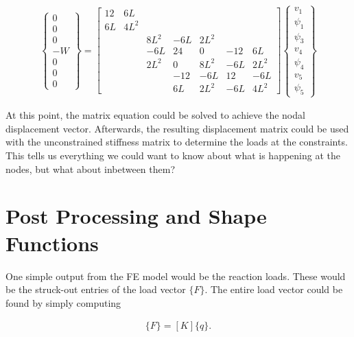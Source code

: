 \documentclass[10pt,letterpaper]{article}
\begin{document}
	\begin{align}
		\begin{Bmatrix}
			0 \\
			0 \\
			0 \\
			-W \\
			0 \\
			0 \\
			0
		\end{Bmatrix} = \begin{bmatrix}
12 & 6L & & & & & \\
6L & 4L^2 & & & & & \\
 & & 8L^2 & -6L & 2L^2 & & \\
 & & -6L & 24 & 0 & -12 & 6L \\
 & & 2L^2 & 0 & 8L^2 & -6L & 2L^2 \\
 & & & -12 & -6L & 12 & -6L \\
 & & & 6L & 2L^2 & -6L & 4L^2 
 		\end{bmatrix} \begin{Bmatrix}
			v_1 \\
			\psi_1 \\
			\psi_3 \\
			v_4 \\
			\psi_4 \\
			v_5 \\
			\psi_5
		\end{Bmatrix}
	\end{align}

	At this point, the matrix equation could be solved to achieve the nodal displacement vector. Afterwards, the resulting displacement matrix could be used with the unconstrained stiffness matrix to determine the loads at the constraints. This tells us everything we could want to know about what is happening at the nodes, but what about inbetween them?

	\newpage
	\section{Post Processing and Shape Functions}

	One simple output from the FE model would be the reaction loads. These would be the struck-out entries of the load vector $\{F\}$. The entire load vector could be found by simply computing 

	\begin{align}
		\{F\} = [K]\{q\} .
	\end{align}
\end{document}
